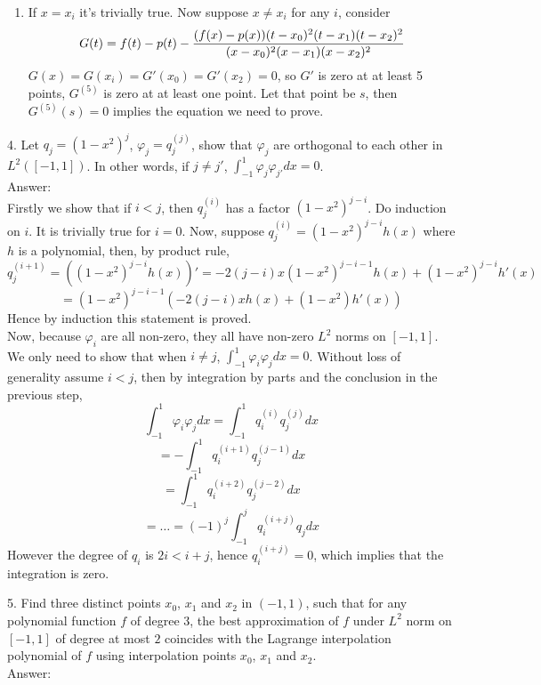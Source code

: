 \documentclass[20pt]{article} %
\theoremstyle{break}
\begin{document}
\begin{enumerate}
    \item If $x=x_i$ it's trivially true. Now suppose $x\not=x_i$ for any $i$, consider
      \[G(t)=f(t)-p(t)-{(f(x)-p(x))(t-x_0)^2(t-x_1)(t-x_2)^2\over (x-x_0)^2(x-x_1)(x-x_2)^2}\]
      $G(x)=G(x_i)=G'(x_0)=G'(x_2)=0$, so $G'$ is zero at at least 5 points, $G^{(5)}$ is zero at at least one point. Let that point be $s$, then $G^{(5)}(s)=0$ implies the equation we need to prove.
\end{enumerate}

\newpage

4. Let $q_j=(1-x^2)^j$, $\varphi_j=q_j^{(j)}$, show that $\varphi_j$ are orthogonal to each other in $L^2([-1, 1])$. In other words, if $j\not=j'$, $\int_{-1}^1\varphi_j\varphi_{j'}dx=0$. \\

Answer:\\

Firstly we show that if $i<j$, then $q_j^{(i)}$ has a factor $(1-x^2)^{j-i}$. Do induction on $i$. It is trivially true for $i=0$. Now, suppose $q_j^{(i)}=(1-x^2)^{j-i}h(x)$ where $h$ is a polynomial, then, by product rule,
\[q_j^{(i+1)}=((1-x^2)^{j-i}h(x))'=-2(j-i)x(1-x^2)^{j-i-1}h(x)+(1-x^2)^{j-i}h'(x)\]
\[=(1-x^2)^{j-i-1}(-2(j-i)xh(x)+(1-x^2)h'(x))\]
Hence by induction this statement is proved.\\

Now, because $\varphi_i$ are all non-zero, they all have non-zero $L^2$ norms on $[-1, 1]$. We only need to show that when $i\not=j$, $\int_{-1}^1\varphi_i\varphi_jdx=0$. Without loss of generality assume $i<j$, then by integration by parts and the conclusion in the previous step,
\[\int_{-1}^1\varphi_i\varphi_jdx=\int_{-1}^1 q_i^{(i)}q_j^{(j)}dx\]
\[=-\int_{-1}^1q_i^{(i+1)}q_j^{(j-1)}dx\]
\[=\int_{-1}^1q_i^{(i+2)}q_j^{(j-2)}dx\]
\[=\dots=(-1)^j\int_{-1}^jq_i^{(i+j)}q_jdx\]
However the degree of $q_i$ is $2i<i+j$, hence $q_i^{(i+j)}=0$, which implies that the integration is zero.\\

\newpage

5. Find three distinct points $x_0$, $x_1$ and $x_2$ in $(-1, 1)$, such that for any polynomial function $f$ of degree $3$, the best approximation of $f$ under $L^2$ norm on $[-1, 1]$ of degree at most $2$ coincides with the Lagrange interpolation polynomial of $f$ using interpolation points $x_0$, $x_1$ and $x_2$.\\

Answer:\\
\end{document}
